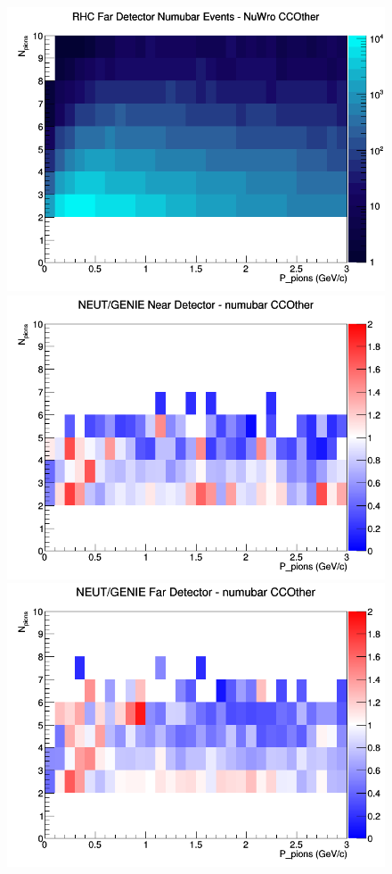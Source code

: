 \documentclass[12pt]{article}
\begin{document}
\begin{figure}[h]
\endminipage
{}
\includegraphics[width=\linewidth]{N_P/nominal/pions/CCOther_RHC_FD_numubar_N_P_NuWro.png}
\endminipage
\newline
{}
\includegraphics[width=\linewidth]{N_P/nominal/pions/ratios/CCOther_NEUT_GENIE_numubar_near_N_P.png}
\endminipage
{}
\includegraphics[width=\linewidth]{N_P/nominal/pions/ratios/CCOther_NEUT_GENIE_numubar_far_N_P.png}

\end{figure}
\end{document}
